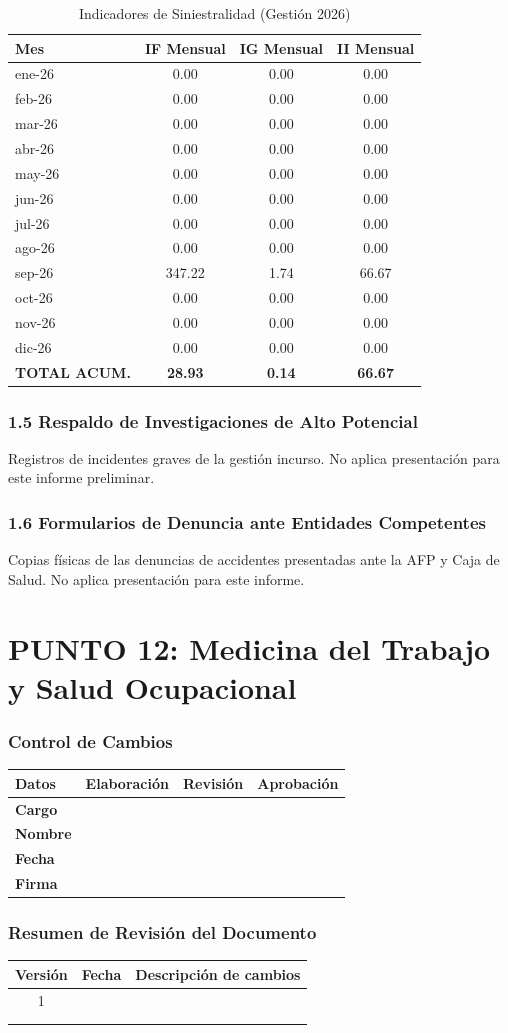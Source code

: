 \documentclass[11pt, letterpaper]{article}
\newcommand{\controlcambios}{
    \subsubsection*{Control de Cambios}
    \begin{table}[H]
        \centering
        \small
        \begin{tabular}{lp{4cm}p{4cm}p{4cm}}
            \toprule
            \textbf{Datos} & \textbf{Elaboración} & \textbf{Revisión} & \textbf{Aprobación} \\
            \midrule
            \textbf{Cargo} & & & \\
            \textbf{Nombre} & & & \\
            \textbf{Fecha} & & & \\
            \textbf{Firma} & & & \\
            \bottomrule
        \end{tabular}
    \end{table}
}
\newcommand{\resumenrevision}[1]{
    \subsubsection*{Resumen de Revisión del Documento}
    \begin{table}[H]
        \centering
        \small
        \begin{tabular}{ccp{8cm}}
            \toprule
            \textbf{Versión} & \textbf{Fecha} & \textbf{Descripción de cambios} \\
            \midrule
            #1 & & \\
            & & \\
            & & \\
            \bottomrule
        \end{tabular}
    \end{table}
}
\begin{document}
\begin{table}[H]
    \centering
    \footnotesize
    \caption{Indicadores de Siniestralidad (Gestión 2026)}
    \begin{tabular}{lccc}
        \toprule
        \textbf{Mes} & \textbf{IF Mensual} & \textbf{IG Mensual} & \textbf{II Mensual} \\
        \midrule
        ene-26 & 0.00 & 0.00 & 0.00 \\
        feb-26 & 0.00 & 0.00 & 0.00 \\
        mar-26 & 0.00 & 0.00 & 0.00 \\
        abr-26 & 0.00 & 0.00 & 0.00 \\
        may-26 & 0.00 & 0.00 & 0.00 \\
        jun-26 & 0.00 & 0.00 & 0.00 \\
        jul-26 & 0.00 & 0.00 & 0.00 \\
        ago-26 & 0.00 & 0.00 & 0.00 \\
        sep-26 & 347.22 & 1.74 & 66.67 \\
        oct-26 & 0.00 & 0.00 & 0.00 \\
        nov-26 & 0.00 & 0.00 & 0.00 \\
        dic-26 & 0.00 & 0.00 & 0.00 \\
        \midrule
        \textbf{TOTAL ACUM.} & \textbf{28.93} & \textbf{0.14} & \textbf{66.67} \\
        \bottomrule
    \end{tabular}
\end{table}
\subsubsection{1.5 Respaldo de Investigaciones de Alto Potencial}
Registros de incidentes graves de la gestión incurso. No aplica presentación para este informe preliminar.

\subsubsection{1.6 Formularios de Denuncia ante Entidades Competentes}
Copias físicas de las denuncias de accidentes presentadas ante la AFP y Caja de Salud. No aplica presentación para este informe.

\newpage
\section{PUNTO 12: Medicina del Trabajo y Salud Ocupacional}
\controlcambios
\resumenrevision{1}
\end{document}
